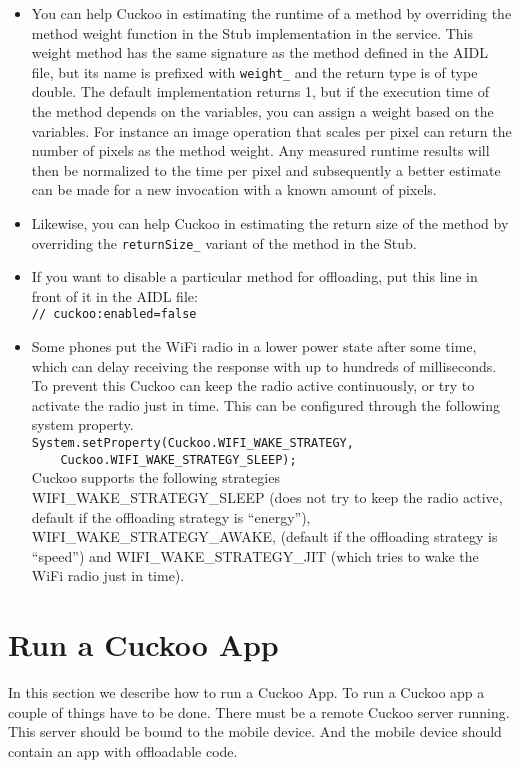 \documentclass{article}
\begin{document}
\begin{itemize}
\item You can help Cuckoo in estimating the runtime of a method by overriding
the method weight function in the Stub implementation in the service. This
weight method has the same signature as the method defined in the AIDL file, but
its name is prefixed with \verb!weight_! and the return type is of type double.
The default implementation returns 1, but if the execution time of the method
depends on the variables, you can assign a weight based on the variables. For
instance an image operation that scales per pixel can return the number of
pixels as the method weight. Any measured runtime results will then be
normalized to the time per pixel and subsequently a better estimate can be made
for a new invocation with a known amount of pixels.
\item Likewise, you can help Cuckoo in estimating the return size of the method
by overriding the \verb!returnSize_! variant of the method in the Stub.
\item If you want to disable a particular method for offloading, put this line
in front of it in the AIDL file:\\
\verb!// cuckoo:enabled=false!  
\item Some phones put the WiFi radio in a lower power state after some time,
which can delay receiving the response with up to hundreds of milliseconds. To
prevent this Cuckoo can keep the radio active continuously, or try to activate
the radio just in time. This can be configured through the following system
property.\\
\verb!System.setProperty(Cuckoo.WIFI_WAKE_STRATEGY,! \\
\verb!    Cuckoo.WIFI_WAKE_STRATEGY_SLEEP);!\\
Cuckoo supports the following strategies WIFI\_WAKE\_STRATEGY\_SLEEP (does not
try to keep the radio active, default if the offloading strategy is ``energy''),
WIFI\_WAKE\_STRATEGY\_AWAKE, (default if the offloading strategy is ``speed'') and
WIFI\_WAKE\_STRATEGY\_JIT (which tries to wake the WiFi radio just in time).
\end{itemize}

\section{Run a Cuckoo App}
In this section we describe how to run a Cuckoo App. To run a Cuckoo app a
couple of things have to be done. There must be a remote Cuckoo server running.
This server should be bound to the mobile device. And the mobile device should
contain an app with offloadable code.
\end{document}
